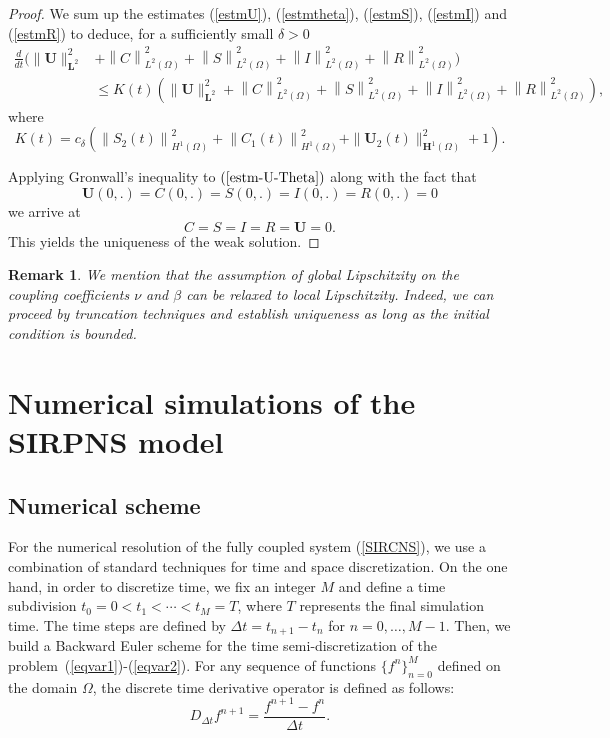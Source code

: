 \documentclass[10pt,number,preprint,times]{elsarticle}
\numberwithin{equation}{section} %
\newtheorem{rem}{Remark}[section]
\begin{document}
\begin{proof}
		
		\noindent	We sum up the estimates (\ref{estmU}), (\ref{estmtheta}),  (\ref{estmS}), (\ref{estmI}) and (\ref{estmR}) to deduce, for a sufficiently small $\delta>0$
		\begin{equation}\label{estm-U-Theta}
			\begin{aligned}
				\frac{d}{d t}\Big(\|\boldsymbol{U}\|_{\mathbf{L}^{2}}^{2}&+ \left\|C\right\|_{L^{2}(\Omega)}^{2}+\left\|S\right\|_{L^{2}(\Omega)}^{2}+\left\|I\right\|_{L^{2}(\Omega)}^{2}+\left\|R\right\|_{L^{2}(\Omega)}^{2} \Big)\\ & \leq K(t)\left(\|\boldsymbol{U}\|_{\mathbf{L}^{2}}^{2}+ \left\|C\right\|_{L^{2}(\Omega)}^{2}+\left\|S\right\|_{L^{2}(\Omega)}^{2}+\left\|I\right\|_{L^{2}(\Omega)}^{2}+\left\|R\right\|_{L^{2}(\Omega)}^{2}  \right),
			\end{aligned} 
		\end{equation}
		where $$K(t)=c_{\delta}\left(\left\|S_2(t)\right\|_{H^{1}(\Omega)}^{2}+\left\|C_1(t)\right\|_{H^{1}(\Omega)}^{2}+\|\boldsymbol{U}_{2}(t)\|_{\mathbf{H}^{1}(\Omega)}^2+1\right).$$
		
		\noindent
		Applying Gronwall's inequality to $(\ref{estm-U-Theta})$ along with the fact that $$\boldsymbol{U}(0,\mathbf{.})=C(0,\mathbf{.})=S(0,\mathbf{.})=I(0,\mathbf{.})=R(0,\mathbf{.})=0$$  
		we arrive at
		$$C=S=I=R=\boldsymbol{U}=0.$$
		\noindent
		This yields the uniqueness of the weak solution. 
	\end{proof}
\begin{rem}
We mention that the assumption of global Lipschitzity on the coupling coefficients $\nu$ and $\beta$ can be relaxed to local Lipschitzity. Indeed, we can proceed by truncation techniques \cite{mehdaoui2024optimal} and establish uniqueness as long as the initial condition is bounded.
\end{rem}

\section{Numerical simulations of the SIRPNS model}\label{numerics}



\subsection{Numerical scheme}
	For the numerical resolution of the fully coupled system (\ref{SIRCNS}), we use a combination of standard techniques for time and space discretization.
	On the one hand, in order to discretize time, we fix an integer $M$ and define a time subdivision
	$
	t_0 = 0 < t_1 < \cdots < t_M = T
	$, 
	where $T$ represents the final simulation time. The time steps are defined by $\Delta t = t_{n+1} - t_n$ for $n = 0, \ldots, M-1$. Then, 
	we build a Backward Euler scheme for the time semi-discretization of the problem~(\ref{eqvar1})-(\ref{eqvar2}). For any sequence of functions $\{f^n\}_{n=0}^{M}$ defined on the domain $\Omega$, the discrete time derivative operator is defined as follows:
	$$
	D_{\Delta t} f^{n+1} = \frac{f^{n+1} - f^n}{\Delta t}.
	$$
	
\end{document}
